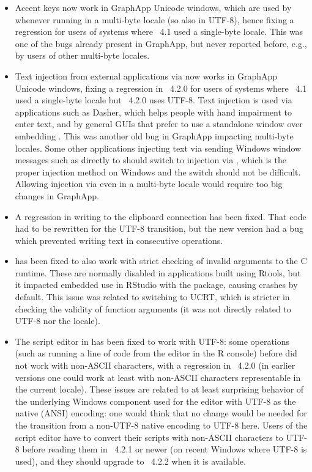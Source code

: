 \begin{itemize}

 \item{} Accent keys now work in GraphApp Unicode windows, which are
  used by  whenever running in a multi-byte locale (so also in
  UTF-8), hence fixing a regression for users of systems where \R{}~4.1 used a
  single-byte locale.  This was one of the bugs already present in
  GraphApp, but never reported before, e.g., by users of other multi-byte
  locales.

 \item{} Text injection from external applications via  now
  works in GraphApp Unicode windows, fixing a regression in \R{}~4.2.0 for
   users of systems where \R{}~4.1 used a single-byte locale
  but \R{}~4.2.0 uses UTF-8.  Text injection is used via applications such
  as Dasher, which helps people with hand impairment to enter text, and by
  general GUIs that prefer to use a standalone  window over
  embedding \R{}.  This was another old bug in GraphApp impacting multi-byte
  locales.  Some other applications injecting text via sending Windows
  window messages such as  directly to  should
  switch to injection via , which is the proper injection
  method on Windows and the switch should not be difficult.  Allowing
  injection via  even in a multi-byte locale would require
  too big changes in GraphApp.

 \item{} A regression in writing to the clipboard connection has been fixed. 
  That code had to be rewritten for the UTF-8 transition, but the new
  version had a bug which prevented writing text in consecutive operations.

 \item{}  has been fixed to also work with strict checking
  of invalid arguments to the C runtime.  These are normally disabled in
  applications built using Rtools, but it impacted embedded use in RStudio
  with the  package, causing crashes by default.  This issue
  was related to switching to UCRT, which is stricter in checking the
  validity of function arguments (it was not directly related to UTF-8 nor
  the locale).

 \item{} The script editor in  has been fixed to work with
  UTF-8: some operations (such as running a line of code from the editor in
  the R console) before did not work with non-ASCII characters, with a
  regression in \R{}~4.2.0 (in earlier versions one could work at least with
  non-ASCII characters representable in the current locale).  These issues
  are related to at least surprising behavior of the underlying Windows
  component used for the editor with UTF-8 as the native (ANSI) encoding:
  one would think that no change would be needed for the transition from a
  non-UTF-8 native encoding to UTF-8 here.  Users of the script editor have
  to convert their scripts with non-ASCII characters to UTF-8 before reading
  them in \R{}~4.2.1 or newer (on recent Windows where UTF-8 is used), and
  they should upgrade to \R{}~4.2.2 when it is available.


\end{itemize}
